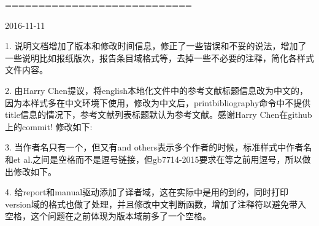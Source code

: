 ============================

2016-11-11

1. 说明文档增加了版本和修改时间信息，修正了一些错误和不妥的说法，增加了一些说明比如报纸版次，报告条目域格式等，去掉一些不必要的注释，简化各样式文件内容。

2. 由Harry Chen提议，将english本地化文件中的参考文献标题信息改为中文的，因为本样式多在中文环境下使用，修改为中文后，printbibliography命令中不提供title信息的情况下，参考文献列表标题默认为参考文献。感谢Harry Chen在github上的commit!
修改如下:
\begin{texlist}
\end{texlist}


3. 当作者名只有一个，但又有and others表示多个作者的时候，标准样式中作者名和et al.之间是空格而不是逗号链接，但gb7714-2015要求在等之前用逗号，所以做出修改如下。

\begin{texlist}
\end{texlist}

4. 给report和manual驱动添加了译者域，这在实际中是用的到的，同时打印version域的格式也做了处理，并且修改中文判断函数，增加了注释符以避免带入空格，这个问题在之前体现为版本域前多了一个空格。
\begin{texlist}
\end{texlist}

